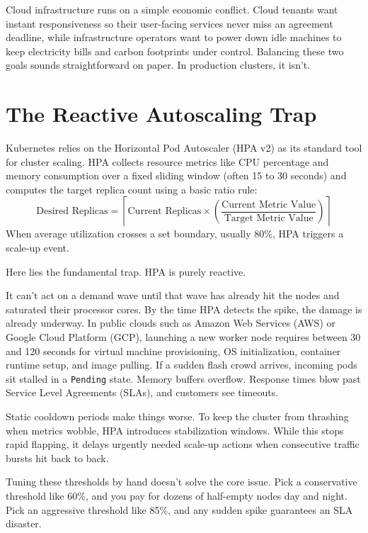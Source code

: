 \documentclass[12pt]{report}
\begin{document}
Cloud infrastructure runs on a simple economic conflict. Cloud tenants want instant responsiveness so their user-facing services never miss an agreement deadline, while infrastructure operators want to power down idle machines to keep electricity bills and carbon footprints under control. Balancing these two goals sounds straightforward on paper. In production clusters, it isn't.

\section{The Reactive Autoscaling Trap}

Kubernetes relies on the Horizontal Pod Autoscaler (HPA v2) as its standard tool for cluster scaling. HPA collects resource metrics like CPU percentage and memory consumption over a fixed sliding window (often 15 to 30 seconds) and computes the target replica count using a basic ratio rule:
\begin{equation}
\text{Desired Replicas} = \left\lceil \text{Current Replicas} \times \left( \frac{\text{Current Metric Value}}{\text{Target Metric Value}} \right) \right\rceil
\end{equation}
When average utilization crosses a set boundary, usually 80\%, HPA triggers a scale-up event.

Here lies the fundamental trap. HPA is purely reactive.

It can't act on a demand wave until that wave has already hit the nodes and saturated their processor cores. By the time HPA detects the spike, the damage is already underway. In public clouds such as Amazon Web Services (AWS) or Google Cloud Platform (GCP), launching a new worker node requires between 30 and 120 seconds for virtual machine provisioning, OS initialization, container runtime setup, and image pulling. If a sudden flash crowd arrives, incoming pods sit stalled in a \texttt{Pending} state. Memory buffers overflow. Response times blow past Service Level Agreements (SLAs), and customers see timeouts.

Static cooldown periods make things worse. To keep the cluster from thrashing when metrics wobble, HPA introduces stabilization windows. While this stops rapid flapping, it delays urgently needed scale-up actions when consecutive traffic bursts hit back to back.

Tuning these thresholds by hand doesn't solve the core issue. Pick a conservative threshold like 60\%, and you pay for dozens of half-empty nodes day and night. Pick an aggressive threshold like 85\%, and any sudden spike guarantees an SLA disaster.
\end{document}
